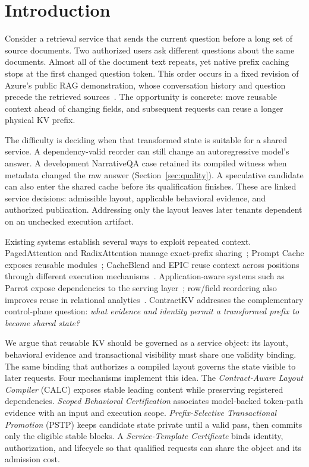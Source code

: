 \section{Introduction}
\label{sec:introduction}

Consider a retrieval service that sends the current question before a long set of source documents. Two authorized users ask different questions about the same documents. Almost all of the document text repeats, yet native prefix caching stops at the first changed question token. This order occurs in a fixed revision of Azure's public RAG demonstration, whose conversation history and question precede the retrieved sources~\cite{azuretemplate}. The opportunity is concrete: move reusable context ahead of changing fields, and subsequent requests can reuse a longer physical KV prefix.

The difficulty is deciding when that transformed state is suitable for a shared service. A dependency-valid reorder can still change an autoregressive model's answer. A development NarrativeQA case retained its compiled witness when metadata changed the raw answer (Section~\ref{sec:quality}). A speculative candidate can also enter the shared cache before its qualification finishes. These are linked service decisions: admissible layout, applicable behavioral evidence, and authorized publication. Addressing only the layout leaves later tenants dependent on an unchecked execution artifact.

Existing systems establish several ways to exploit repeated context. PagedAttention and RadixAttention manage exact-prefix sharing~\cite{vllm2023,sglang2024}; Prompt Cache exposes reusable modules~\cite{promptcache2024}; CacheBlend and EPIC reuse context across positions through different execution mechanisms~\cite{cacheblend2025,epic2025}. Application-aware systems such as Parrot expose dependencies to the serving layer~\cite{parrot2024}; row/field reordering also improves reuse in relational analytics~\cite{llmqueries2025}. ContractKV addresses the complementary control-plane question: \emph{what evidence and identity permit a transformed prefix to become shared state?}

We argue that reusable KV should be governed as a service object: its layout, behavioral evidence and transactional visibility must share one validity binding. The same binding that authorizes a compiled layout governs the state visible to later requests. Four mechanisms implement this idea. The \emph{Contract-Aware Layout Compiler} (CALC) exposes stable leading content while preserving registered dependencies. \emph{Scoped Behavioral Certification} associates model-backed token-path evidence with an input and execution scope. \emph{Prefix-Selective Transactional Promotion} (PSTP) keeps candidate state private until a valid pass, then commits only the eligible stable blocks. A \emph{Service-Template Certificate} binds identity, authorization, and lifecycle so that qualified requests can share the object and its admission cost.

